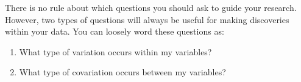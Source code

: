 \documentclass{article}
\begin{document}
There is no rule about which questions you should ask to guide your research. However, two types of questions will always be useful for making discoveries within your data. You can loosely word these questions as:

\begin{enumerate}
  \item What type of variation occurs within my variables?
  \item What type of covariation occurs between my variables?
\end{enumerate}
\end{document}
